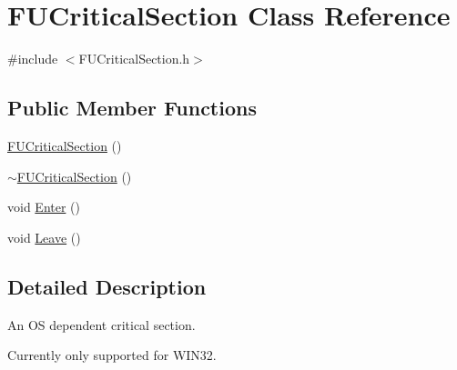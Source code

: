 \hypertarget{classFUCriticalSection}{
\section{FUCriticalSection Class Reference}
\label{classFUCriticalSection}
}


{\ttfamily \#include $<$FUCriticalSection.h$>$}

\subsection*{Public Member Functions}
\begin{DoxyCompactItemize}
\item 
\hyperlink{classFUCriticalSection_acdb9b7289811342a3c3567fa4457e789}{FUCriticalSection} ()
\item 
\hyperlink{classFUCriticalSection_a6f2d184126a8d4259ebb36d9cf59ece5}{$\sim$FUCriticalSection} ()
\item 
void \hyperlink{classFUCriticalSection_a8c501b5f6d4ef387bceb89f1d0be8dcb}{Enter} ()
\item 
void \hyperlink{classFUCriticalSection_addb2b27c543b8598e636966438093c6e}{Leave} ()
\end{DoxyCompactItemize}


\subsection{Detailed Description}
An OS dependent critical section.

Currently only supported for WIN32. 

